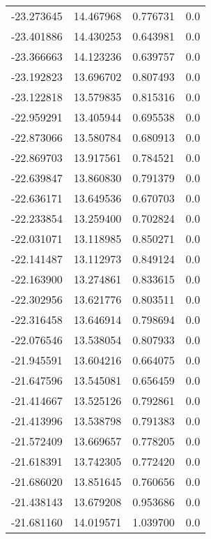 \begin{tabular}{rrrr}
      -23.273645 &        14.467968 &    0.776731 &   0.0 \\
      -23.401886 &        14.430253 &    0.643981 &   0.0 \\
      -23.366663 &        14.123236 &    0.639757 &   0.0 \\
      -23.192823 &        13.696702 &    0.807493 &   0.0 \\
      -23.122818 &        13.579835 &    0.815316 &   0.0 \\
      -22.959291 &        13.405944 &    0.695538 &   0.0 \\
      -22.873066 &        13.580784 &    0.680913 &   0.0 \\
      -22.869703 &        13.917561 &    0.784521 &   0.0 \\
      -22.639847 &        13.860830 &    0.791379 &   0.0 \\
      -22.636171 &        13.649536 &    0.670703 &   0.0 \\
      -22.233854 &        13.259400 &    0.702824 &   0.0 \\
      -22.031071 &        13.118985 &    0.850271 &   0.0 \\
      -22.141487 &        13.112973 &    0.849124 &   0.0 \\
      -22.163900 &        13.274861 &    0.833615 &   0.0 \\
      -22.302956 &        13.621776 &    0.803511 &   0.0 \\
      -22.316458 &        13.646914 &    0.798694 &   0.0 \\
      -22.076546 &        13.538054 &    0.807933 &   0.0 \\
      -21.945591 &        13.604216 &    0.664075 &   0.0 \\
      -21.647596 &        13.545081 &    0.656459 &   0.0 \\
      -21.414667 &        13.525126 &    0.792861 &   0.0 \\
      -21.413996 &        13.538798 &    0.791383 &   0.0 \\
      -21.572409 &        13.669657 &    0.778205 &   0.0 \\
      -21.618391 &        13.742305 &    0.772420 &   0.0 \\
      -21.686020 &        13.851645 &    0.760656 &   0.0 \\
      -21.438143 &        13.679208 &    0.953686 &   0.0 \\
      -21.681160 &        14.019571 &    1.039700 &   0.0 \\

\end{tabular}
